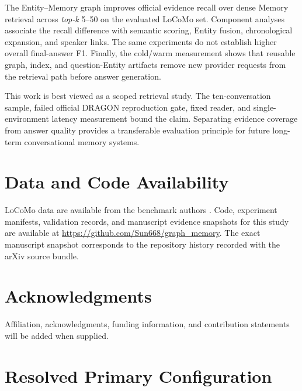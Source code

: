 \documentclass[10pt,twocolumn]{article}
\newcommand{\topk}{\textit{top-k}}
\begin{document}
The Entity--Memory graph improves official evidence recall over dense Memory
retrieval across \topk{} 5--50 on the evaluated LoCoMo set. Component analyses
associate the recall difference with semantic scoring, Entity fusion,
chronological expansion, and speaker links. The same experiments do not
establish higher overall final-answer F1. Finally, the cold/warm measurement
shows that reusable graph, index, and question-Entity artifacts remove new
provider requests from the retrieval path before answer generation.

This work is best viewed as a scoped retrieval study. The ten-conversation
sample, failed official DRAGON reproduction gate, fixed reader, and
single-environment latency measurement bound the claim. Separating evidence
coverage from answer quality provides a transferable evaluation principle for
future long-term conversational memory systems.

\section*{Data and Code Availability}

LoCoMo data are available from the benchmark authors
\citep{maharana2024locomo}. Code, experiment manifests, validation records,
and manuscript evidence snapshots for this study are available at
\url{https://github.com/Sun668/graph_memory}. The exact manuscript snapshot
corresponds to the repository history recorded with the arXiv source bundle.

\section*{Acknowledgments}

Affiliation, acknowledgments, funding information, and contribution statements
will be added when supplied.




\appendix
\onecolumn

\section{Resolved Primary Configuration}
\label{app:config}
\end{document}
